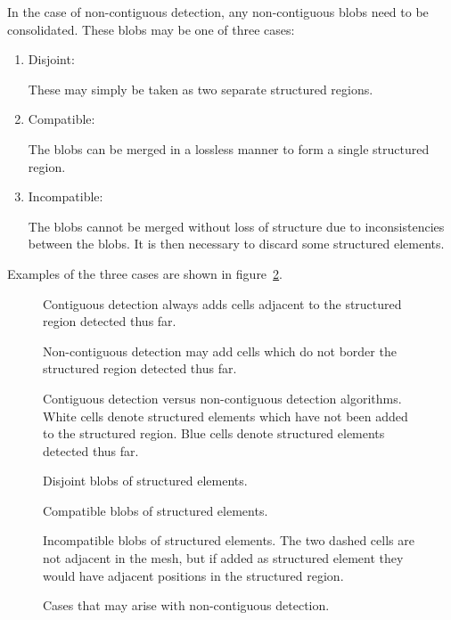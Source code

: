 In the case of non-contiguous detection, any non-contiguous blobs need to be consolidated. These blobs may be one of three cases:
\begin{enumerate}
\item Disjoint:

These may simply be taken as two separate structured regions.

\item Compatible:

The blobs can be merged in a lossless manner to form a single structured region.

\item Incompatible:

The blobs cannot be merged without loss of structure due to inconsistencies between the blobs. It is then necessary to discard some structured elements.
\end{enumerate}

Examples of the three cases are shown in figure~\ref{fig:non-contiguous-detection}.


\begin{figure}

\sidebyside
{
	\drawmatrix[cell wd=0.6, cell ht=0.6]{\contiguousmatrix}
	\caption{Contiguous detection always adds cells adjacent to the structured region detected thus far.}
}
{
	\drawmatrix[cell wd=0.6, cell ht=0.6]{\noncontiguousmatrix}
	\caption{Non-contiguous detection may add cells which do not border the structured region detected thus far.}
}
\caption{Contiguous detection versus non-contiguous detection algorithms. White cells denote structured elements which have not been added to the structured region. Blue cells denote structured elements detected thus far.\label{fig:contiguous-detection}}
\end{figure}

\begin{figure}
\sidebysidethreeverticaltop
{
	
	\caption{Disjoint blobs of structured elements.}
}
{
	
	\caption{Compatible blobs of structured elements.}
}
{
	
	\caption{Incompatible blobs of structured elements. The two dashed cells are not adjacent in the mesh, but if added as structured element they would have adjacent positions in the structured region.}
}
\caption{Cases that may arise with non-contiguous detection.\label{fig:non-contiguous-detection}}
\end{figure}


